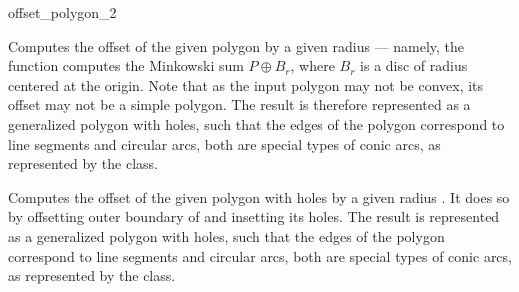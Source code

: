 
\ccRefPageBegin

\begin{ccRefFunction}{offset_polygon_2}


   {Computes the offset of the given polygon  by a given radius
     --- namely, the function computes the Minkowski sum
    $P \oplus B_r$, where $B_r$ is a disc of radius  centered at the
    origin.
    Note that as the input polygon may not be convex, its offset may not be a
    simple polygon. The result is therefore represented as a generalized
    polygon with holes, such that the edges of the polygon correspond to
    line segments and circular arcs, both are special types of conic arcs,
    as represented by the  class.
    }

   {Computes the offset of the given polygon with holes  by a given
    radius . It does so by offsetting outer boundary of  and
    insetting its holes.
    The result is represented as a generalized polygon with holes, such that the
    edges of the polygon correspond to line segments and circular arcs, both are
    special types of conic arcs, as represented by the  class.
    }


\end{ccRefFunction}
